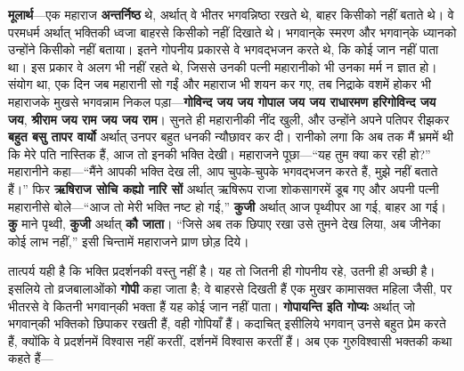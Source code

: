 \begin{sloppypar}\justifying{}
\textbf{मूलार्थ}—एक महाराज \textbf{अन्तर्निष्ठ} थे, अर्थात् वे भीतर भगवन्निष्ठा रखते थे, बाहर किसीको नहीं बताते थे। वे परमधर्म अर्थात् भक्तिकी ध्वजा बाहरसे किसीको नहीं दिखाते थे। भगवान्‌के स्मरण और भगवान्‌के ध्यानको उन्होंने किसीको नहीं बताया। इतने गोपनीय प्रकारसे वे भगवद्भजन करते थे, कि कोई जान नहीं पाता था। इस प्रकार वे अलग भी नहीं रहते थे, जिससे उनकी पत्नी महारानीको भी उनका मर्म न ज्ञात हो। संयोग था, एक दिन जब महारानी सो गईं और महाराज भी शयन कर गए, तब निद्राके वशमें होकर भी महाराजके मुखसे भगवन्नाम निकल पड़ा—\textbf{गोविन्द जय जय गोपाल जय जय राधारमण हरिगोविन्द जय जय}, \textbf{श्रीराम जय राम जय जय राम}। सुनते ही महारानीकी नींद खुली, और उन्होंने अपने पतिपर रीझकर \textbf{बहुत बसु तापर वार्यो} अर्थात् उनपर बहुत धनकी न्यौछावर कर दी। रानीको लगा कि अब तक मैं भ्रममें थी कि मेरे पति नास्तिक हैं, आज तो इनकी भक्ति देखी। महाराजने पूछा—“यह तुम क्या कर रही हो?” महारानीने कहा—“मैंने आपकी भक्ति देख ली, आप चुपके-चुपके भगवद्भजन करते हैं, मुझे नहीं बताते हैं।” फिर \textbf{ऋषिराज सोचि कह्यो नारि सों} अर्थात् ऋषिरूप राजा शोक\-सागरमें डूब गए और अपनी पत्नी महारानीसे बोले—“आज तो मेरी भक्ति नष्ट हो गई,” \textbf{कुजी} अर्थात् आज पृथ्वीपर आ गई, बाहर आ गई। \textbf{कु} माने पृथ्वी, \textbf{कुजी} अर्थात् \textbf{कौ जाता}। “जिसे अब तक छिपाए रखा उसे तुमने देख लिया, अब जीनेका कोई लाभ नहीं,” इसी चिन्तामें महाराजने प्राण छोड़ दिये।
\end{sloppypar}
\begin{sloppypar}\justifying{}
तात्पर्य यही है कि भक्ति प्रदर्शनकी वस्तु नहीं है। यह तो जितनी ही गोपनीय रहे, उतनी ही अच्छी है। इसलिये तो व्रजबालाओंको \textbf{गोपी} कहा जाता है; वे बाहरसे दिखती हैं एक मुखर कामासक्त महिला जैसी, पर भीतरसे वे कितनी भगवान्‌की भक्ता हैं यह कोई जान नहीं पाता। \textbf{गोपायन्ति इति गोप्यः} अर्थात् जो भगवान्‌की भक्तिको छिपाकर रखती हैं, वही गोपियाँ हैं। कदाचित् इसीलिये भगवान् उनसे बहुत प्रेम करते हैं, क्योंकि वे प्रदर्शनमें विश्वास नहीं करतीं, दर्शनमें विश्वास करतीं हैं। अब एक गुरु\-विश्वासी भक्तकी कथा कहते हैं—
\end{sloppypar}


